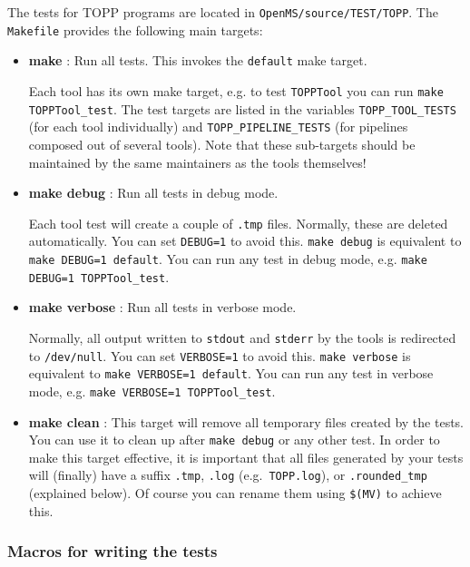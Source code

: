 \documentclass[a4]{article}
\begin{document}
The tests for TOPP programs are located in \texttt{OpenMS/source/TEST/TOPP}.
The \texttt{Makefile} provides the following main targets:
\begin{itemize}
 \item \textbf{make} : Run all tests.  This invokes the \texttt{default} make target.

  Each tool has its own make target, e.g. to test \texttt{TOPPTool}
  you can run \texttt{make TOPPTool\_test}.  The test targets are listed in
  the variables \texttt{TOPP\_TOOL\_TESTS} (for each tool individually) and
  \texttt{TOPP\_PIPELINE\_TESTS} (for pipelines composed out of several
  tools).  Note that these sub-targets should be maintained by the same
  maintainers as the tools themselves!
  
 \item \textbf{make debug} : Run all tests in debug mode.

  Each tool test will create a couple of \texttt{.tmp} files.  Normally, these
  are deleted automatically.  You can set \texttt{DEBUG=1} to avoid this.
  \texttt{make debug} is equivalent to \texttt{make DEBUG=1 default}.  You can
  run any test in debug mode, e.g.  \texttt{make DEBUG=1 TOPPTool\_test}.

 \item \textbf{make verbose} : Run all tests in verbose mode.

  Normally, all output written to \texttt{stdout} and \texttt{stderr} by the
  tools is redirected to \texttt{/dev/null}.  You can set \texttt{VERBOSE=1}
  to avoid this.  \texttt{make verbose} is equivalent to \texttt{make
    VERBOSE=1 default}.  You can run any test in verbose mode, e.g.
  \texttt{make VERBOSE=1 TOPPTool\_test}.

 \item \textbf{make clean} : This target will remove all temporary files
  created by the tests.  You can use it to clean up after \texttt{make debug}
  or any other test.  In order to make this target effective, it is important
  that all files generated by your tests will (finally) have a suffix
  \texttt{.tmp}, \texttt{.log} (e.g.\ \texttt{TOPP.log}), or
  \texttt{.rounded\_tmp} (explained below).  Of course you can rename them
  using \texttt{\$(MV)} to achieve this.

\end{itemize}

\subsubsection{Macros for writing the tests}
\end{document}
